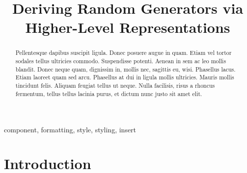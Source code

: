 \documentclass[conference, fleqn]{IEEEtran}
\begin{document}
\title{Deriving Random Generators via\\ Higher-Level Representations}

\author{
\and
{}
}

\maketitle


\begin{abstract}

  Pellentesque dapibus suscipit ligula. Donec posuere augue in quam. Etiam vel
  tortor sodales tellus ultricies commodo. Suspendisse potenti. Aenean in sem ac
  leo mollis blandit. Donec neque quam, dignissim in, mollis nec, sagittis eu,
  wisi. Phasellus lacus. Etiam laoreet quam sed arcu. Phasellus at dui in ligula
  mollis ultricies. Mauris mollis tincidunt felis. Aliquam feugiat tellus ut
  neque. Nulla facilisis, risus a rhoncus fermentum, tellus tellus lacinia
  purus, et dictum nunc justo sit amet elit.

\end{abstract}

\begin{IEEEkeywords}
component, formatting, style, styling, insert
\end{IEEEkeywords}


\section{Introduction}
\end{document}

